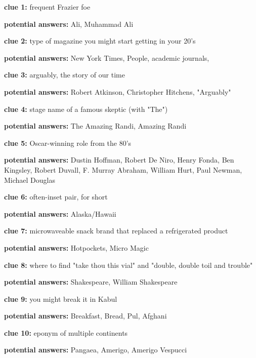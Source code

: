 \documentclass{article}
\begin{document}
\quad

\textbf{clue 1: } frequent Frazier foe

\quad\textbf{potential answers:} Ali, Muhammad Ali

\quad

\textbf{clue 2: } type of magazine you might start getting in your 20's

\quad\textbf{potential answers:} New York Times, People,  academic journals, 

\quad

\textbf{clue 3: } arguably, the story of our time 

\quad\textbf{potential answers:} Robert Atkinson, Christopher Hitchens, "Arguably"

\quad

\textbf{clue 4: } stage name of a famous skeptic (with "The")

\quad\textbf{potential answers:} The Amazing Randi, Amazing Randi

\quad

\textbf{clue 5: } Oscar-winning role from the 80's

\quad\textbf{potential answers:} Dustin Hoffman, Robert De Niro, Henry Fonda, Ben Kingsley, Robert Duvall, F. Murray Abraham, William Hurt, Paul Newman, Michael Douglas

\quad

\textbf{clue 6: } often-inset pair, for short

\quad\textbf{potential answers:} Alaska/Hawaii

\quad

\textbf{clue 7: } microwaveable snack brand that replaced a refrigerated product

\quad\textbf{potential answers:} Hotpockets, Micro Magic

\quad

\textbf{clue 8: } where to find "take thou this vial" and "double, double toil and trouble"

\quad\textbf{potential answers:} Shakespeare, William Shakespeare

\quad

\textbf{clue 9: } you might break it in Kabul

\quad\textbf{potential answers:} Breakfast, Bread, Pul, Afghani

\quad

\textbf{clue 10: } eponym of multiple continents

\quad\textbf{potential answers:} Pangaea, Amerigo, Amerigo Vespucci
\end{document}
